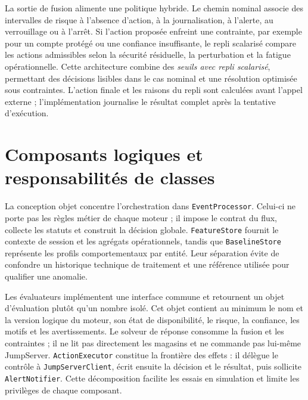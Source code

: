 \documentclass[11pt,a4paper,oneside]{report}
\theoremstyle{definition}
\theoremstyle{plain}
\begin{document}
La sortie de fusion alimente une politique hybride. Le chemin nominal associe
des intervalles de risque à l'absence d'action, à la journalisation, à l'alerte,
au verrouillage ou à l'arrêt. Si l'action proposée enfreint une contrainte, par
exemple pour un compte protégé ou une confiance insuffisante, le repli
scalarisé compare les actions admissibles selon la sécurité résiduelle, la
perturbation et la fatigue opérationnelle. Cette architecture combine des
\emph{seuils avec repli scalarisé}, permettant des décisions lisibles dans le
cas nominal et une résolution optimisée sous contraintes. L'action finale et
les raisons du repli sont calculées avant l'appel externe ; l'implémentation
journalise le résultat complet après la tentative d'exécution.

\section{Composants logiques et responsabilités de classes}

La conception objet concentre l'orchestration dans \texttt{EventProcessor}.
Celui-ci ne porte pas les règles métier de chaque moteur ; il impose le contrat
du flux, collecte les statuts et construit la décision globale.
\texttt{FeatureStore} fournit le contexte de session et les agrégats
opérationnels, tandis que \texttt{BaselineStore} représente les profils
comportementaux par entité. Leur séparation évite de confondre un historique
technique de traitement et une référence utilisée pour qualifier une anomalie.

Les évaluateurs implémentent une interface commune et retournent un objet
d'évaluation plutôt qu'un nombre isolé. Cet objet contient au minimum le nom et
la version logique du moteur, son état de disponibilité, le risque, la
confiance, les motifs et les avertissements. Le solveur de réponse consomme la
fusion et les contraintes ; il ne lit pas directement les magasins et ne
commande pas lui-même JumpServer. \texttt{ActionExecutor} constitue la frontière
des effets : il délègue le contrôle à \texttt{JumpServerClient}, écrit ensuite
la décision et le résultat, puis sollicite \texttt{AlertNotifier}. Cette
décomposition facilite les essais en simulation et limite les privilèges de
chaque composant.
\end{document}
